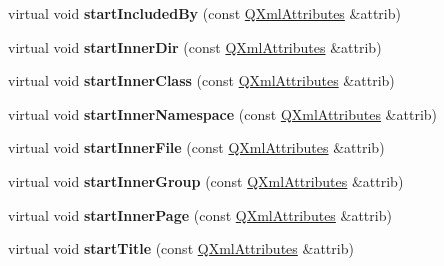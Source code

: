 \begin{DoxyCompactItemize}
\item 
\mbox{\label{class_compound_handler_a05aec5b2a0d7a2ec1f051d1ee2ec530e}} 
virtual void {\bfseries start\+Included\+By} (const \mbox{\hyperlink{class_q_xml_attributes}{Q\+Xml\+Attributes}} \&attrib)
\item 
\mbox{\label{class_compound_handler_a23e8b99dbc930abc24de98cd6ba7e655}} 
virtual void {\bfseries start\+Inner\+Dir} (const \mbox{\hyperlink{class_q_xml_attributes}{Q\+Xml\+Attributes}} \&attrib)
\item 
\mbox{\label{class_compound_handler_ac679de74dff995d610a56e02b0514450}} 
virtual void {\bfseries start\+Inner\+Class} (const \mbox{\hyperlink{class_q_xml_attributes}{Q\+Xml\+Attributes}} \&attrib)
\item 
\mbox{\label{class_compound_handler_a0b045d1ad64a89a70ec6190f6984cc46}} 
virtual void {\bfseries start\+Inner\+Namespace} (const \mbox{\hyperlink{class_q_xml_attributes}{Q\+Xml\+Attributes}} \&attrib)
\item 
\mbox{\label{class_compound_handler_ad164a8e627f8b9f0e90a911e8e0315b7}} 
virtual void {\bfseries start\+Inner\+File} (const \mbox{\hyperlink{class_q_xml_attributes}{Q\+Xml\+Attributes}} \&attrib)
\item 
\mbox{\label{class_compound_handler_ad4f1a558819f11cfec06844cef9315c2}} 
virtual void {\bfseries start\+Inner\+Group} (const \mbox{\hyperlink{class_q_xml_attributes}{Q\+Xml\+Attributes}} \&attrib)
\item 
\mbox{\label{class_compound_handler_a15312512eb7aa2b772885fc5e84eb410}} 
virtual void {\bfseries start\+Inner\+Page} (const \mbox{\hyperlink{class_q_xml_attributes}{Q\+Xml\+Attributes}} \&attrib)
\item 
\mbox{\label{class_compound_handler_a6a9c0f1427deca9d29aa96a746543eba}} 
virtual void {\bfseries start\+Title} (const \mbox{\hyperlink{class_q_xml_attributes}{Q\+Xml\+Attributes}} \&attrib)
\item 
\mbox{\label{class_compound_handler_ab22159348e5da740cde39d18a2b12bcb}} 

\end{DoxyCompactItemize}
